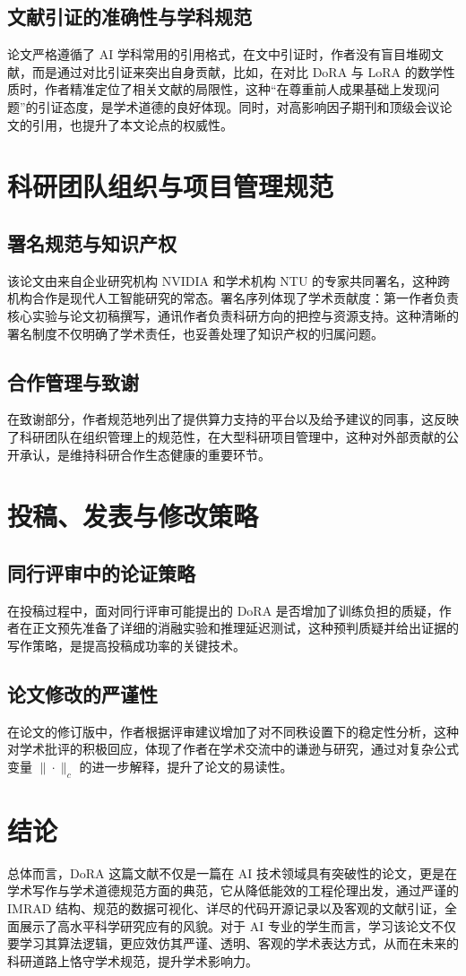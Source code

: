 \documentclass[12pt, hyperref, a4paper, UTF8]{ctexart}
\begin{document}
\subsection{文献引证的准确性与学科规范}
论文严格遵循了 AI 学科常用的引用格式，在文中引证时，作者没有盲目堆砌文献，而是通过对比引证来突出自身贡献，比如，在对比 DoRA 与 LoRA 的数学性质时，作者精准定位了相关文献的局限性，这种“在尊重前人成果基础上发现问题”的引证态度，是学术道德的良好体现。同时，对高影响因子期刊和顶级会议论文的引用，也提升了本文论点的权威性。



\section{科研团队组织与项目管理规范}
\subsection{署名规范与知识产权}
该论文由来自企业研究机构 NVIDIA 和学术机构 NTU 的专家共同署名，这种跨机构合作是现代人工智能研究的常态。署名序列体现了学术贡献度：第一作者负责核心实验与论文初稿撰写，通讯作者负责科研方向的把控与资源支持。这种清晰的署名制度不仅明确了学术责任，也妥善处理了知识产权的归属问题。



\subsection{合作管理与致谢}
在致谢部分，作者规范地列出了提供算力支持的平台以及给予建议的同事，这反映了科研团队在组织管理上的规范性，在大型科研项目管理中，这种对外部贡献的公开承认，是维持科研合作生态健康的重要环节。



\section{投稿、发表与修改策略}
\subsection{同行评审中的论证策略}
在投稿过程中，面对同行评审可能提出的 DoRA 是否增加了训练负担的质疑，作者在正文预先准备了详细的消融实验和推理延迟测试，这种预判质疑并给出证据的写作策略，是提高投稿成功率的关键技术。



\subsection{论文修改的严谨性}
在论文的修订版中，作者根据评审建议增加了对不同秩设置下的稳定性分析，这种对学术批评的积极回应，体现了作者在学术交流中的谦逊与研究，通过对复杂公式变量 $\|\cdot\|_c$ 的进一步解释，提升了论文的易读性。



\section*{结论}
总体而言，DoRA 这篇文献不仅是一篇在 AI 技术领域具有突破性的论文，更是在学术写作与学术道德规范方面的典范，它从降低能效的工程伦理出发，通过严谨的 IMRAD 结构、规范的数据可视化、详尽的代码开源记录以及客观的文献引证，全面展示了高水平科学研究应有的风貌。对于 AI 专业的学生而言，学习该论文不仅要学习其算法逻辑，更应效仿其严谨、透明、客观的学术表达方式，从而在未来的科研道路上恪守学术规范，提升学术影响力。
\end{document}
